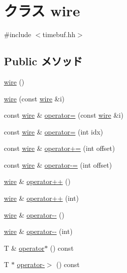 \hypertarget{classTimeBuffer_1_1wire}{
\section{クラス wire}
\label{classTimeBuffer_1_1wire}
}


{\ttfamily \#include $<$timebuf.hh$>$}\subsection*{Public メソッド}
\begin{DoxyCompactItemize}
\item 
\hyperlink{classTimeBuffer_1_1wire_aee5e970f3a165458d46430f828e9d2c2}{wire} ()
\item 
\hyperlink{classTimeBuffer_1_1wire_a6a20c12d3bf89170b87215cf247b21dc}{wire} (const \hyperlink{classTimeBuffer_1_1wire}{wire} \&i)
\item 
const \hyperlink{classTimeBuffer_1_1wire}{wire} \& \hyperlink{classTimeBuffer_1_1wire_ac5762487c55cd8ca177c966d3e349f44}{operator=} (const \hyperlink{classTimeBuffer_1_1wire}{wire} \&i)
\item 
const \hyperlink{classTimeBuffer_1_1wire}{wire} \& \hyperlink{classTimeBuffer_1_1wire_af9026c4d5b1cde4a2f9a028412d58f16}{operator=} (int idx)
\item 
const \hyperlink{classTimeBuffer_1_1wire}{wire} \& \hyperlink{classTimeBuffer_1_1wire_afd320aab0d51d48a842b52f515576553}{operator+=} (int offset)
\item 
const \hyperlink{classTimeBuffer_1_1wire}{wire} \& \hyperlink{classTimeBuffer_1_1wire_a0bab44a2a3adf81ee12237b4070fecc8}{operator-\/=} (int offset)
\item 
\hyperlink{classTimeBuffer_1_1wire}{wire} \& \hyperlink{classTimeBuffer_1_1wire_af6c8d85cc90a527a49cced363965a371}{operator++} ()
\item 
\hyperlink{classTimeBuffer_1_1wire}{wire} \& \hyperlink{classTimeBuffer_1_1wire_a8093b8f9d4bf061e125fd37ff797e7d1}{operator++} (int)
\item 
\hyperlink{classTimeBuffer_1_1wire}{wire} \& \hyperlink{classTimeBuffer_1_1wire_a86cbe68de5240a72f6c4dbe99414e6ff}{operator-\/-\/} ()
\item 
\hyperlink{classTimeBuffer_1_1wire}{wire} \& \hyperlink{classTimeBuffer_1_1wire_ad635ac4e1df2d6e7880602b4804c03a5}{operator-\/-\/} (int)
\item 
T \& \hyperlink{classTimeBuffer_1_1wire_abcc36ef133f26e7e3145b785df23eb18}{operator$\ast$} () const 
\item 
T $\ast$ \hyperlink{classTimeBuffer_1_1wire_ac0ddd007dfcfef3121f74d0665dfd0cd}{operator-\/$>$} () const 
\end{DoxyCompactItemize}
